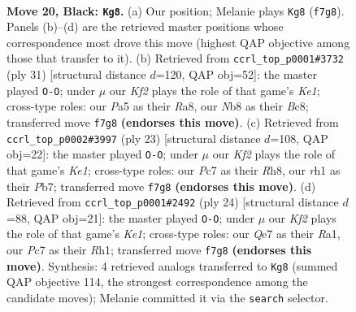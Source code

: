 \documentclass[11pt]{article}
\begin{document}
\clearpage

\begin{figure}[p]\centering
\begin{subfigure}{0.46\textwidth}\centering
\resizebox{\linewidth}{!}{%
\newchessgame
\chessboard[
  setfen={rnb1r3/2pnqkpp/1p2p3/p2pPp2/3P1P1P/P4NQ1/1PPKN1P1/1R3B1R b - - 2 20},
  showmover=false,
  pgfstyle=straightmove, color=movearrow, markmove={f7-g8}
]}
\caption{}
\end{subfigure}\hfill
\begin{subfigure}{0.46\textwidth}\centering
\resizebox{\linewidth}{!}{%
\newchessgame
\chessboard[
  setfen={r1b1k2r/2qn1pp1/2n1p2p/pp1pP3/8/P1P1RN2/1PB2PPP/RN2Q1K1 b kq - 2 16},
  showmover=false,
  pgfstyle=straightmove, color=movearrow, markmove={e8-g8}
]}
\caption{}
\end{subfigure}
\\[4pt]
\begin{subfigure}{0.46\textwidth}\centering
\resizebox{\linewidth}{!}{%
\newchessgame
\chessboard[
  setfen={2rqk2r/1p2bppp/p1nppn2/2p5/2P1PP2/1PNP4/P5PP/R1BQNR1K b k - 2 12},
  showmover=false,
  pgfstyle=straightmove, color=movearrow, markmove={e8-g8}
]}
\caption{}
\end{subfigure}\hfill
\begin{subfigure}{0.46\textwidth}\centering
\resizebox{\linewidth}{!}{%
\newchessgame
\chessboard[
  setfen={r1b1r1k1/ppqn1ppp/2p2n2/3pp3/P2P4/N1P1PN2/1PQ1BPPP/R3K2R w KQ - 0 13},
  showmover=false,
  pgfstyle=straightmove, color=movearrow, markmove={e1-g1}
]}
\caption{}
\end{subfigure}
\caption{\textbf{Move 20, Black: \texttt{Kg8}.} (a) Our position; Melanie plays \texttt{Kg8} (\texttt{f7g8}). Panels (b)--(d) are the retrieved master positions whose correspondence most drove this move (highest QAP objective among those that transfer to it). (b) Retrieved from \texttt{ccrl\_top\_p0001\#3732} (ply 31) [structural distance $d$=120, QAP obj=52]: the master played \texttt{O-O}; under $\mu$ our \emph{Kf2} plays the role of that game's \emph{Ke1}; cross-type roles: our \emph{P}a5 as their \emph{R}a8, our \emph{N}b8 as their \emph{B}c8; transferred move \texttt{f7g8} \textbf{(endorses this move)}. (c) Retrieved from \texttt{ccrl\_top\_p0002\#3997} (ply 23) [structural distance $d$=108, QAP obj=22]: the master played \texttt{O-O}; under $\mu$ our \emph{Kf2} plays the role of that game's \emph{Ke1}; cross-type roles: our \emph{P}c7 as their \emph{R}h8, our \emph{r}h1 as their \emph{P}b7; transferred move \texttt{f7g8} \textbf{(endorses this move)}. (d) Retrieved from \texttt{ccrl\_top\_p0001\#2492} (ply 24) [structural distance $d$=88, QAP obj=21]: the master played \texttt{O-O}; under $\mu$ our \emph{Kf2} plays the role of that game's \emph{Ke1}; cross-type roles: our \emph{Q}e7 as their \emph{R}a1, our \emph{P}c7 as their \emph{R}h1; transferred move \texttt{f7g8} \textbf{(endorses this move)}. Synthesis: 4 retrieved analogs transferred to \texttt{Kg8} (summed QAP objective 114, the strongest correspondence among the candidate moves); Melanie committed it via the \texttt{search} selector.}
\label{fig:thought-m39}
\end{figure}
\end{document}
